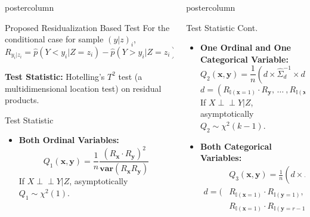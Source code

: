 \documentclass{beamer}
\def\ci{\perp\!\!\!\!\!\perp}
\newlength{\columnheight}
\begin{document}
\begin{frame}
\begin{columns}
\begin{column}{.33\textwidth}
\begin{beamercolorbox}[center]{postercolumn}
\begin{minipage}{.98\textwidth}
{\begin{myblock}{Proposed Residualization Based Test}
				For the conditional case for sample $ (y|z)_i $,
				$$ R_{y_i | z_i} = \hat{p}(Y < y_i | Z=z_i) - \hat{p}(Y>y_i|Z=z_i) $$ \\
				\vspace{0.8em}
		\justifying \textbf{Test Statistic:} Hotelling's $ T^2 $ test
				(a multidimensional location test) on residual
				products.
	\end{myblock}\vfill
	\begin{myblock}{Test Statistic}
		\begin{itemize}
			\item \textbf{Both Ordinal Variables:}
			$$ Q_1(\bm{x}, \bm{y}) = \frac{1}{n} \frac{(R_{\bm{x}} \cdot R_{\bm{y}})^2}{\bm{var}(R_{\bm{x}} R_{\bm{y}})} $$
			If $ X \ci Y | Z $, asymptotically $ Q_1 \sim \chi^2(1) $.
		\end{itemize}
	\end{myblock}\vfill
		}\end{minipage}\end{beamercolorbox}
	\end{column}


	\begin{column}{.33\textwidth}
		\begin{beamercolorbox}[center]{postercolumn}
			\begin{minipage}{.98\textwidth} %
				\parbox[t][\columnheight]{\textwidth}{ %
	\begin{myblock}{Test Statistic Cont.}
		\begin{itemize}
			\item \textbf{One Ordinal and One Categorical Variable:}
						$$ Q_2(\bm{x}, \bm{y}) = \frac{1}{n} (d \times \hat{\Sigma}_d^{-1} \times d^T) $$
						$$ d = (R_{\mathbb{I}(\mathbf{x}=1)} \cdot R_{\mathbf{y}}, \, \ldots \ , R_{\mathbb{I}(\mathbf{x}=k-1)} \cdot R_{\mathbf{y}}) $$
				If $ X \ci Y | Z $, asymptotically $ Q_2 \sim \chi^2(k-1) $.
			\item \textbf{Both Categorical Variables:}
			\begin{equation*}
				\begin{split}
					& Q_3(\bm{x}, \bm{y}) = \frac{1}{n} (d \times \hat{\Sigma}_d^{-1} \times d^T) \\
				d = (&R_{\mathbb{I}(\mathbf{x}=1)} \cdot R_{\mathbb{I}(\mathbf{y}=1)}, \, \ldots \ ,
						R_{\mathbb{I}(\mathbf{x}=k-1)} R_{\mathbb{I}(\mathbf{y}=1)}, \, \ldots \, , \\
				     &R_{\mathbb{I}(\mathbf{x}=1)} \cdot R_{\mathbb{I}(\mathbf{y}=r-1)}, \, \ldots \ ,
						R_{\mathbb{I}(\mathbf{x}=k-1)} R_{\mathbb{I}(\mathbf{y}=r-1)}) 
				\end{split}
			\end{equation*}
			

\end{itemize}
\end{myblock}}
\end{minipage}
\end{beamercolorbox}
\end{column}
\end{columns}
\end{frame}
\end{document}
